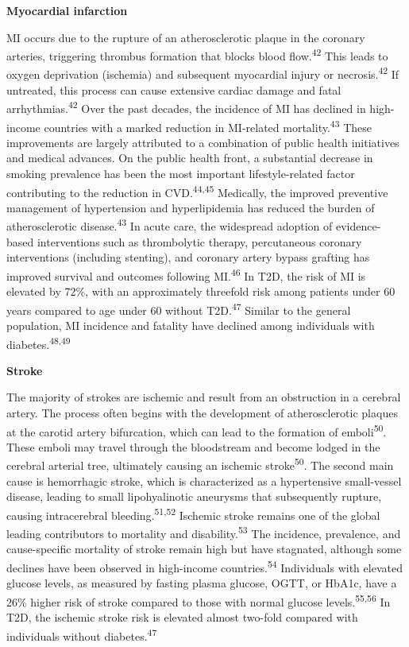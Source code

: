 \documentclass[
  a4paper,
  headsepline=true,
  open=left]{scrbook}
\begin{document}
\textbf{Myocardial infarction}

MI occurs due to the rupture of an atherosclerotic plaque in the
coronary arteries, triggering thrombus formation that blocks blood
flow.\textsuperscript{42} This leads to oxygen deprivation (ischemia)
and subsequent myocardial injury or necrosis.\textsuperscript{42} If
untreated, this process can cause extensive cardiac damage and fatal
arrhythmias.\textsuperscript{42} Over the past decades, the incidence of
MI has declined in high-income countries with a marked reduction in
MI-related mortality.\textsuperscript{43} These improvements are largely
attributed to a combination of public health initiatives and medical
advances. On the public health front, a substantial decrease in smoking
prevalence has been the most important lifestyle-related factor
contributing to the reduction in CVD.\textsuperscript{44,45} Medically,
the improved preventive management of hypertension and hyperlipidemia
has reduced the burden of atherosclerotic disease.\textsuperscript{43}
In acute care, the widespread adoption of evidence-based interventions
such as thrombolytic therapy, percutaneous coronary interventions
(including stenting), and coronary artery bypass grafting has improved
survival and outcomes following MI.\textsuperscript{46} In T2D, the risk
of MI is elevated by 72\%, with an approximately threefold risk among
patients under 60 years compared to age under 60 without
T2D.\textsuperscript{47} Similar to the general population, MI incidence
and fatality have declined among individuals with
diabetes.\textsuperscript{48,49}

\textbf{Stroke}

The majority of strokes are ischemic and result from an obstruction in a
cerebral artery. The process often begins with the development of
atherosclerotic plaques at the carotid artery bifurcation, which can
lead to the formation of emboli\textsuperscript{50}. These emboli may
travel through the bloodstream and become lodged in the cerebral
arterial tree, ultimately causing an ischemic
stroke\textsuperscript{50}. The second main cause is hemorrhagic stroke,
which is characterized as a hypertensive small-vessel disease, leading
to small lipohyalinotic aneurysms that subsequently rupture, causing
intracerebral bleeding.\textsuperscript{51,52} Ischemic stroke remains
one of the global leading contributors to mortality and
disability.\textsuperscript{53} The incidence, prevalence, and
cause-specific mortality of stroke remain high but have stagnated,
although some declines have been observed in high-income
countries.\textsuperscript{54} Individuals with elevated glucose levels,
as measured by fasting plasma glucose, OGTT, or HbA1c, have a 26\%
higher risk of stroke compared to those with normal glucose
levels.\textsuperscript{55,56} In T2D, the ischemic stroke risk is
elevated almost two-fold compared with individuals without
diabetes.\textsuperscript{47}
\end{document}
